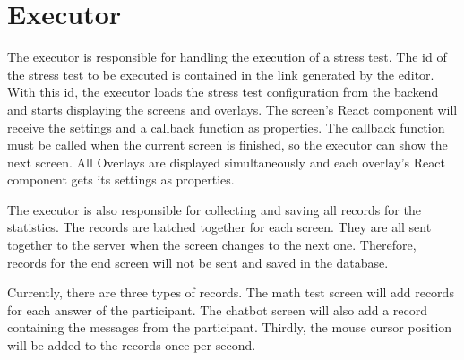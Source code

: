 \section{Executor}
\label{sec:executor}

The executor is responsible for handling the execution of a stress test.
The id of the stress test to be executed is contained in the link generated by the editor.
With this id, the executor loads the stress test configuration from the backend and starts displaying the screens and overlays.
The screen's React component will receive the settings and a callback function as properties. 
The callback function must be called when the current screen is finished, so the executor can show the next screen. 
All Overlays are displayed simultaneously and each overlay's React component gets its settings as properties.

The executor is also responsible for collecting and saving all records for the statistics.
The records are batched together for each screen.
They are all sent together to the server when the screen changes to the next one.
Therefore, records for the end screen will not be sent and saved in the database.

Currently, there are three types of records.
The math test screen will add records for each answer of the participant.
The chatbot screen will also add a record containing the messages from the participant.
Thirdly, the mouse cursor position will be added to the records once per second.
